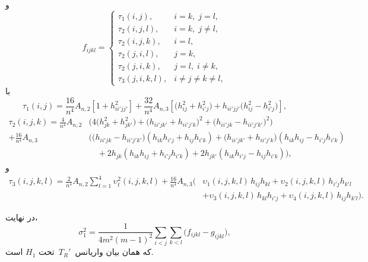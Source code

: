 \begin{اثبات}
	و
	\begin{equation}
		f_{ijkl}=
		\begin{cases}
			\tau_{1}(i,j), & i{=}k,\; j{=}l,\\[2pt]
			\tau_{2}(i,j,l), & i{=}k,\; j\neq l,\\[2pt]
			\tau_{2}(i,j,k), & i{=}l,\\[2pt]
			\tau_{2}(j,i,l), & j{=}k,\\[2pt]
			\tau_{2}(j,i,k), & j{=}l,\; i\neq k,\\[2pt]
			\tau_{3}(j,i,k,l), & i\neq j\neq k\neq l,
		\end{cases}
	\end{equation}
	با
	\begin{equation}
		\tau_{1}(i,j)=\frac{16}{n^{4}}A_{n,2}\!\left[1+h^{2}_{ii'jj'}\right]
		+\frac{32}{n^{4}}A_{n,3}\!\left[\big(h_{ij}^{2}+h_{i'j}^{2}\big)+h_{ii'jj'}\big(h_{ij}^{2}-h_{i'j}^{2}\big)\right],
	\end{equation}
	\begin{equation}
		\begin{aligned}
			\tau_{2}(i,j,k)=\frac{4}{n^{4}}A_{n,2}&\Big(4\big(h_{jk}^{2}+h_{jk'}^{2}\big)
			+\big(h_{ii'jk'}+h_{ii'j'k}\big)^{2}
			+\big(h_{ii'jk}-h_{ii'j'k'}\big)^{2}\Big)\\
			+\frac{16}{n^{4}}A_{n,3}&\Big(
			\big(h_{ii'jk}-h_{ii'j'k'}\big)(h_{ik}h_{i'j}+h_{ij}h_{i'k})
			+\big(h_{ii'jk'}+h_{ii'j'k}\big)(h_{ik}h_{ij}-h_{i'j}h_{i'k})\\
			&\quad+2h_{jk}(h_{ik}h_{ij}+h_{i'j}h_{i'k})
			+2h_{jk'}(h_{ik}h_{i'j}-h_{ij}h_{i'k})\Big),
		\end{aligned}
	\end{equation}
	و
	\begin{equation}
		\begin{aligned}
			\tau_{3}(i,j,k,l)=\frac{2}{n^{4}}A_{n,2}\sum_{t=1}^{4}\upsilon_{t}^{2}(i,j,k,l)
			+\frac{16}{n^{4}}A_{n,3}\Big(
			&\upsilon_{1}(i,j,k,l)\,h_{ij}h_{kl}
			+\upsilon_{2}(i,j,k,l)\,h_{i'j}h_{k'l}\\
			&+\upsilon_{3}(i,j,k,l)\,h_{kl}h_{i'j}
			+\upsilon_{4}(i,j,k,l)\,h_{ij}h_{k'l}
			\Big).
		\end{aligned}
	\end{equation}
	
	در نهایت،
	\begin{equation}
		\sigma_{1}^{2}
		=\frac{1}{4m^{2}(m-1)^{2}}
		\sum_{i<j}\sum_{k<l}\big(f_{ijkl}-g_{ijkl}\big),
	\end{equation}
	که همان بیان واریانس \(\,T_{R}'\,\) تحت \(H_{1}\) است. 
	
\end{اثبات}

